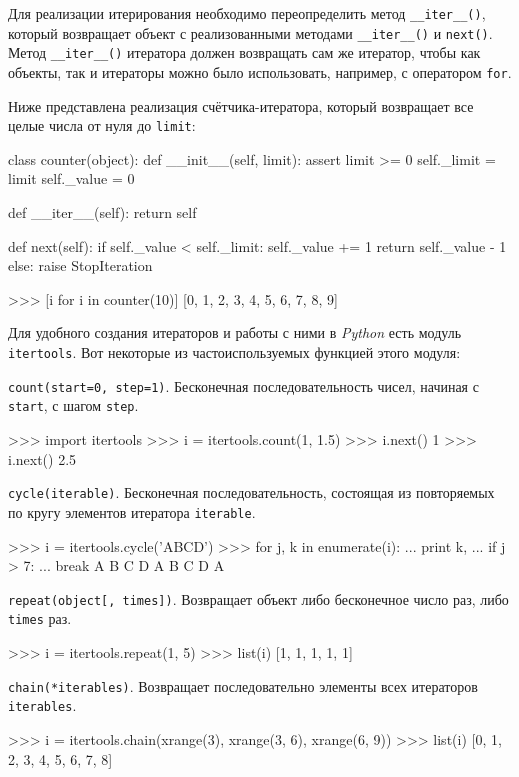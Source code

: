 Для реализации итерирования необходимо переопределить метод \lstinline{__iter__()}, который возвращает объект с реализованными методами \lstinline{__iter__()} и \lstinline{next()}. Метод \lstinline{__iter__()} итератора должен возвращать сам же итератор, чтобы как объекты, так и итераторы можно было использовать, например, с оператором \lstinline{for}.

Ниже представлена реализация счётчика-итератора, который возвращает все целые числа от нуля до \lstinline{limit}:
\begin{pylst}{}{}
class counter(object):
    def __init__(self, limit):
        assert limit >= 0
        self._limit = limit
        self._value = 0

    def __iter__(self):
        return self

    def next(self):
        if self._value < self._limit:
            self._value += 1
            return self._value - 1
        else:
            raise StopIteration

>>> [i for i in counter(10)]
[0, 1, 2, 3, 4, 5, 6, 7, 8, 9]
\end{pylst}

Для удобного создания итераторов и работы с ними в \emph{Python} есть модуль \lstinline{itertools}. Вот некоторые из частоиспользуемых функцией этого модуля:

\lstinline{count(start=0, step=1)}. Бесконечная последовательность чисел, начиная с \lstinline{start}, с шагом \lstinline{step}.
\begin{pylst}{}{}
>>> import itertools
>>> i = itertools.count(1, 1.5)
>>> i.next()
1
>>> i.next()
2.5
\end{pylst}

\lstinline{cycle(iterable)}. Бесконечная последовательность, состоящая из повторяемых по кругу элементов итератора \lstinline{iterable}.
\begin{pylst}{}{}
>>> i = itertools.cycle('ABCD')
>>> for j, k in enumerate(i):
...     print k,
...     if j > 7:
...         break
A B C D A B C D A
\end{pylst}

\lstinline{repeat(object[, times])}. Возвращает объект либо бесконечное число раз, либо \lstinline{times} раз.
\begin{pylst}{}{}
>>> i = itertools.repeat(1, 5)
>>> list(i)
[1, 1, 1, 1, 1]
\end{pylst}

\lstinline{chain(*iterables)}. Возвращает последовательно элементы всех итераторов \lstinline{iterables}.
\begin{pylst}{}{}
>>> i = itertools.chain(xrange(3), xrange(3, 6), xrange(6, 9))
>>> list(i)
[0, 1, 2, 3, 4, 5, 6, 7, 8]
\end{pylst}


